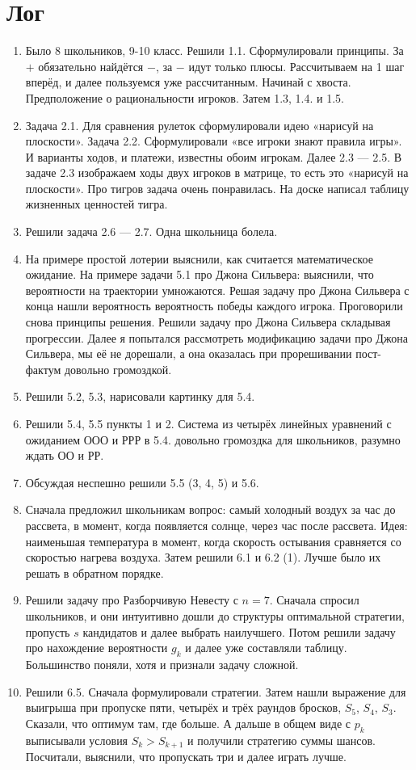 \documentclass[12pt]{article}
\theoremstyle{definition}
\begin{document}
\section{Лог}

\begin{enumerate}
  \item Было 8 школьников, 9-10 класс. Решили 1.1. Сформулировали принципы.
  За $+$ обязательно найдётся $-$, за $-$ идут только плюсы.
  Рассчитываем на 1 шаг вперёд, и далее пользуемся уже рассчитанным.
  Начинай с хвоста. Предположение о рациональности игроков.  Затем 1.3, 1.4. и 1.5.
  \item Задача 2.1. Для сравнения рулеток сформулировали идею «нарисуй на плоскости».
  Задача 2.2. Сформулировали «все игроки знают правила игры». И варианты
  ходов, и платежи, известны обоим игрокам. Далее 2.3 — 2.5.
  В задаче 2.3 изображаем ходы двух игроков в матрице, то есть это
  «нарисуй на плоскости». Про тигров задача очень понравилась. На доске написал
  таблицу жизненных ценностей тигра.
  \item Решили задача 2.6 — 2.7. Одна школьница болела.
  \item На примере простой лотерии выяснили, как считается математическое
  ожидание. На примере задачи 5.1 про Джона Сильвера: выяснили, что вероятности на
  траектории умножаются. Решая задачу про Джона Сильвера с конца нашли вероятность
  вероятность победы каждого игрока. Проговорили снова принципы решения.
  Решили задачу про Джона Сильвера складывая прогрессии. Далее я попытался
  рассмотреть модификацию задачи про Джона Сильвера, мы её не дорешали,
  а она оказалась при прорешивании пост-фактум довольно громоздкой.
  \item Решили 5.2, 5.3, нарисовали картинку для 5.4.
  \item Решили 5.4, 5.5 пункты 1 и 2. Система из четырёх линейных уравнений с
  ожиданием ООО и РРР в 5.4. довольно громоздка для школьников, разумно ждать ОО и РР.
  \item Обсуждая неспешно решили 5.5 (3, 4, 5) и 5.6.
  \item Сначала предложил школьникам вопрос: самый холодный воздух за час до рассвета,
  в момент, когда появляется солнце, через час после рассвета. Идея: наименьшая
  температура в момент, когда скорость остывания сравняется со скоростью нагрева воздуха.
  Затем решили 6.1 и 6.2 (1). Лучше было их решать в обратном порядке.
  \item Решили задачу про Разборчивую Невесту с $n=7$. Сначала спросил школьников,
  и они интуитивно дошли до структуры оптимальной стратегии, пропусть $s$ кандидатов
  и далее выбрать наилучшего. Потом решили задачу про нахождение вероятности $g_k$ и
  далее уже составляли таблицу. Большинство поняли, хотя и признали задачу сложной.
  \item Решили 6.5. Сначала формулировали стратегии. Затем нашли выражение для выигрыша
  при пропуске пяти, четырёх и трёх раундов бросков, $S_5$, $S_4$, $S_3$.
  Сказали, что оптимум там, где больше. А дальше в общем виде с $p_k$ выписывали условия
  $S_k > S_{k+1}$ и получили стратегию суммы шансов. Посчитали, выяснили,
  что пропускать три и далее играть лучше.  
\end{enumerate}
\end{document}
